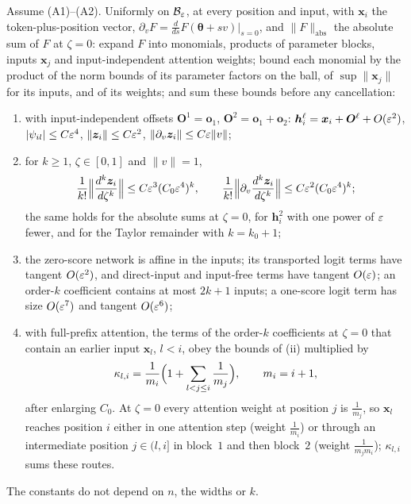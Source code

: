 \begin{proposition}
\label{prop:network}
Assume (A1)--(A2). Uniformly on $\mathcal B_{\varepsilon}$, at every position and input, with $\bm x_i$ the token-plus-position vector,
$\partial_vF=\frac{d}{ds}F(\bm\theta+sv)|_{s=0}$, and $\|F\|_{\mathrm{abs}}$ the absolute sum of $F$ at $\zeta=0$: expand $F$ into monomials, products of
parameter blocks, inputs $\bm x_j$ and input-independent attention weights; bound each monomial by the product of the norm bounds of its
parameter factors on the ball, of $\sup\|\bm x_j\|$ for its inputs, and of its weights; and sum these bounds before any cancellation:
\begin{enumerate}[label=(\roman*),leftmargin=*,itemsep=1pt,topsep=2pt]
\item with input-independent offsets $\bm O^1=\bm o_1$, $\bm O^2=\bm o_1+\bm o_2$: $\bm h_i^\ell=\bm x_i+\bm O^\ell+O(\varepsilon^2)$, $|\psi_{il}|\le C\varepsilon^4$,
$\|\bm z_i\|\le C\varepsilon^2$, $\|\partial_v\bm z_i\|\le C\varepsilon\|v\|$;
\item for $k\ge1$, $\zeta\in[0,1]$ and $\|v\|=1$,
\[
 \frac{1}{k!}\Bigl\|\frac{d^k\bm z_i}{d\zeta^k}\Bigr\|\le C\varepsilon^3(C_0\varepsilon^4)^k,\qquad
 \frac{1}{k!}\Bigl\|\partial_v\frac{d^k\bm z_i}{d\zeta^k}\Bigr\|\le C\varepsilon^2(C_0\varepsilon^4)^k;
\]
the same holds for the absolute sums at $\zeta=0$, for $\bm h^2_i$ with one power of $\varepsilon$ fewer, and for the Taylor remainder with $k=k_0+1$;
\item the zero-score network is affine in the inputs; its transported logit terms have tangent $O(\varepsilon^2)$, and direct-input and
input-free terms have tangent $O(\varepsilon)$; an order-$k$ coefficient contains at most $2k+1$ inputs; a one-score logit term has size
$O(\varepsilon^7)$ and tangent $O(\varepsilon^6)$;
\item with full-prefix attention, the terms of the order-$k$ coefficients at $\zeta=0$ that contain an earlier input $\bm x_l$, $l<i$, obey the
bounds of (ii) multiplied by
\begin{equation}
 \kappa_{l,i}=\frac{1}{m_i}\Bigl(1+\sum_{l<j\le i}\frac{1}{m_j}\Bigr),\qquad m_i=i+1,
 \label{eq:dilution}
\end{equation}
after enlarging $C_0$. At $\zeta=0$ every attention weight at position $j$ is $\frac{1}{m_j}$, so $\bm x_l$ reaches position $i$ either
in one attention step (weight $\frac{1}{m_i}$) or through an intermediate position $j\in(l,i]$ in block~$1$ and then block~$2$ (weight
$\frac{1}{m_jm_i}$); $\kappa_{l,i}$ sums these routes.
\end{enumerate}
The constants do not depend on $n$, the widths or $k$.
\end{proposition}

